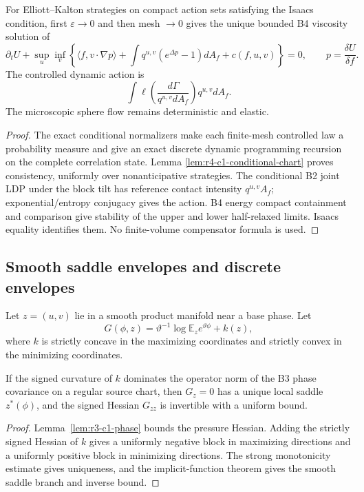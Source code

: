 \begin{theorem}
\label{thm:r3-c1-adaptive}
For Elliott--Kalton strategies on compact action sets satisfying the Isaacs
condition, first \(\varepsilon\to0\) and then mesh \(\to0\) gives the unique
bounded B4 viscosity solution of
\[
 \partial_tU+\sup_u\inf_v
 \left\{
 \langle f,v\cdot\nabla p\rangle
 +\int q^{u,v}(e^{\Delta p}-1)dA_f+c(f,u,v)
 \right\}=0,
 \qquad p=\frac{\delta U}{\delta f}.
\]
The controlled dynamic action is
\[
 \int\ell\left(
 \frac{d\Gamma}{q^{u,v}dA_f}
 \right)q^{u,v}dA_f.
\]
The microscopic sphere flow remains deterministic and elastic.
\end{theorem}

\begin{proof}
The exact conditional normalizers make each finite-mesh controlled law a
probability measure and give an exact discrete dynamic programming recursion
on the complete correlation state.  Lemma
\ref{lem:r4-c1-conditional-chart} proves consistency, uniformly over
nonanticipative strategies.  The conditional B2 joint LDP under the block tilt
has reference contact intensity \(q^{u,v}A_f\); exponential/entropy conjugacy
gives the action.  B4 energy compact containment and comparison give stability
of the upper and lower half-relaxed limits.  Isaacs equality identifies them.
No finite-volume compensator formula is used.
\end{proof}

\subsection{Smooth saddle envelopes and discrete envelopes}

Let \(z=(u,v)\) lie in a smooth product manifold near a base phase.  Let
\[
 G(\phi,z)
 =\vartheta^{-1}\log\mathbb E_z e^{\vartheta\phi}+k(z),
\]
where \(k\) is strictly concave in the maximizing coordinates and strictly
convex in the minimizing coordinates.

\begin{lemma}
\label{lem:r3-c1-invertible}
If the signed curvature of \(k\) dominates the operator norm of the B3 phase
covariance on a regular source chart, then \(G_z=0\) has a unique local saddle
\(z^*(\phi)\), and the signed Hessian \(G_{zz}\) is invertible with a uniform
bound.
\end{lemma}

\begin{proof}
Lemma~\ref{lem:r3-c1-phase} bounds the pressure Hessian.  Adding the strictly
signed Hessian of \(k\) gives a uniformly negative block in maximizing
directions and a uniformly positive block in minimizing directions.  The
strong monotonicity estimate gives uniqueness, and the implicit-function
theorem gives the smooth saddle branch and inverse bound.
\end{proof}

